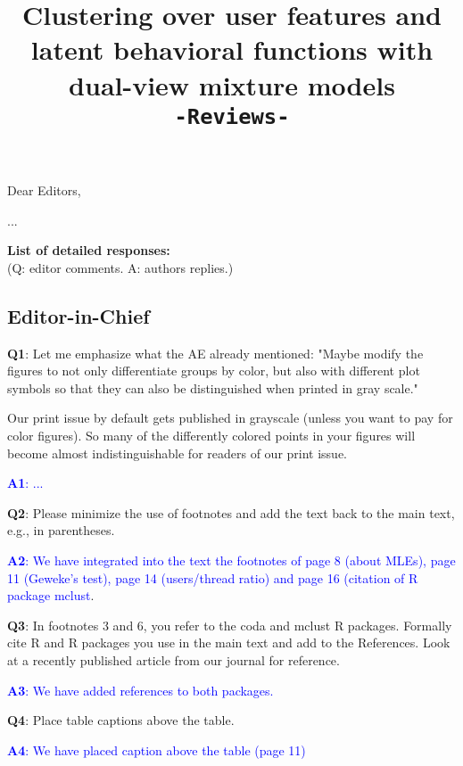 \documentclass[]{article}
\title{Clustering over user features and latent behavioral functions with dual-view mixture models \\ \texttt{-Reviews-}}
\author{}
\begin{document}
	\date{}
	\maketitle
	
	Dear Editors,
	
	...
	
	\bigskip
	\noindent
	\textbf{List of detailed responses:}\\
	(Q: editor comments.
	A: authors replies.)
	\subsection*{Editor-in-Chief}
	
	\vspace{3mm}	
	 \textbf{Q1}: Let me emphasize what the AE already mentioned: "Maybe modify the figures to not only differentiate groups by color, but also with different plot symbols so that they can also be distinguished when printed in gray scale."

Our print issue by default gets published in grayscale (unless you want to pay for color figures). So many of the differently colored points in your figures will become almost indistinguishable for readers of our print issue.
		
		\textcolor{blue}{  \textbf{A1}: ...} 
	\vspace{3mm}	

	\textbf{Q2}: Please minimize the use of footnotes and add the text back to the main text, e.g., in parentheses.
		
		\textcolor{blue}{  \textbf{A2}: We have integrated into the text the footnotes of page 8 (about  MLEs), page 11 (Geweke's test), page 14 (users/thread ratio) and page 16 (citation of R package mclust}.

	\vspace{3mm}	
		
\textbf{Q3}:  In footnotes 3 and 6, you refer to the coda and mclust R packages. Formally cite R and R packages you use in the main text and add to the References. Look at a recently published article from our journal for reference.
		
		\textcolor{blue}{  \textbf{A3}: We have added references to both packages.} 

	\vspace{3mm}	

\textbf{Q4}:  Place table captions above the table.

		\textcolor{blue}{  \textbf{A4}: We have placed caption above the table (page 11)} 
\end{document}
